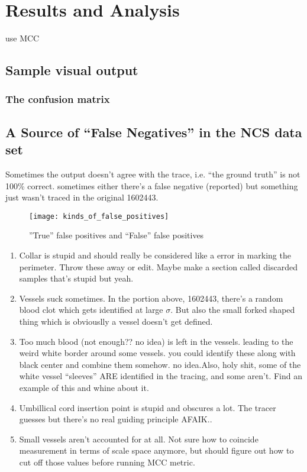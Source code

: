 
\chapter{Results and Analysis}

use MCC \cite{mcc-original-paper}
\section{Sample visual output}
\subsection{The confusion matrix}
\section{A Source of ``False Negatives'' in the NCS data set} \label{sec:NCS-dataset-issues}

Sometimes the output doesn't agree with the trace, i.e. ``the ground truth'' is not 100\% correct.
sometimes either there's a false negative (reported) but something just wasn't traced in the original  1602443.

\begin{figure} \centering
	\texttt{[image: kinds\_of\_false\_positives]}
	\caption{''True'' false positives and ``False'' false positives}
\end{figure}


\begin{enumerate}
\item Collar is stupid and should really be considered like a error in marking the perimeter. Throw these away or edit. Maybe make a section called discarded samples that's stupid but yeah.
\item Vessels suck sometimes. In the portion above, 1602443, there's a random blood clot which gets identified at large $\sigma$. But also the small forked shaped thing which is obviouslly a vessel doesn't get defined.
\item Too much blood (not enough?? no idea) is left in the vessels. leading to the weird white border around some vessels. you could identify these along with black center and combine them somehow. no idea.Also, holy shit, some of the white vessel ``sleeves'' ARE identified in the tracing, and some aren't. Find an example of this and whine about it.
\item Umbillical cord insertion point is stupid and obscures a lot. The tracer guesses but there's no real guiding principle AFAIK..
\item Small vessels aren't accounted for at all. Not sure how to coincide measurement in terms of scale space anymore, but should figure out how to cut off those values before running MCC metric.
\end{enumerate}


